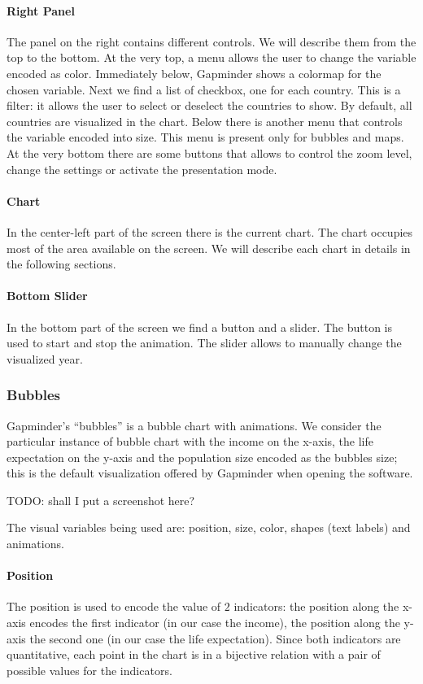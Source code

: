 \paragraph{Right Panel}
The panel on the right contains different controls.
We will describe them from the top to the bottom.
At the very top, a menu allows the user to change the variable encoded as color.
Immediately below, Gapminder shows a colormap for the chosen variable.
Next we find a list of checkbox, one for each country.
This is a filter: it allows the user to select or deselect the countries to show.
By default, all countries are visualized in the chart.
Below there is another menu that controls the variable encoded into size.
This menu is present only for bubbles and maps.
At the very bottom there are some buttons that allows to control the zoom level, change the settings or activate the presentation mode.

\paragraph{Chart}
In the center-left part of the screen there is the current chart.
The chart occupies most of the area available on the screen.
We will describe each chart in details in the following sections.

\paragraph{Bottom Slider}
In the bottom part of the screen we find a button and a slider.
The button is used to start and stop the animation.
The slider allows to manually change the visualized year.

\subsubsection{Bubbles}
Gapminder's ``bubbles'' is a bubble chart with animations.
We consider the particular instance of bubble chart with the income on the x-axis, the life expectation on the y-axis and the population size encoded as the bubbles size; this is the default visualization offered by Gapminder when opening the software.

\vspace{0.5cm}
TODO: shall I put a screenshot here?

The visual variables being used are: position, size, color, shapes (text labels) and animations.

\paragraph{Position}
The position is used to encode the value of $2$ indicators: the position along the x-axis encodes the first indicator (in our case the income), the position along the y-axis the second one (in our case the life expectation).
Since both indicators are quantitative, each point in the chart is in a bijective relation with a pair of possible values for the indicators.

